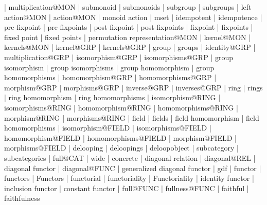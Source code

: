     |   multiplication@MON
    |   submonoid
    |   submonoids
    |   subgroup
    |   subgroups
    |   left action@MON
    |   action@MON
    |   monoid action
    |   mset
    |   idempotent
    |   idempotence 
    |   pre-fixpoint
    |   pre-fixpoints
    |   post-fixpoint
    |   post-fixpoints
    |   fixpoint
    |   fixpoints
    |   fixed point
    |   fixed points
    |   permutation representation@MON
    |   kernel@MON
    |   kernels@MON
    |   kernel@GRP
    |   kernels@GRP
    |   group
    |   groups
    |   identity@GRP
    |   multiplication@GRP
    |   isomorphism@GRP
    |   isomorphisms@GRP
    |   group isomorphism
    |   group isomorphisms
    |   group homomorphism
    |   group homomorphisms
    |   homomorphism@GRP
    |   homomorphisms@GRP
    |   morphism@GRP
    |   morphisms@GRP
    |   inverse@GRP
    |   inverses@GRP
    |   ring
    |   rings
    |   ring homomorphism
    |   ring homomorphisms
    |   isomorphism@RING
    |   isomorphisms@RING
    |   homomorphism@RING
    |   homomorphisms@RING
    |   morphism@RING
    |   morphisms@RING
    |   field
    |   fields
    |   field homomorphism
    |   field homomorphisms
    |   isomorphism@FIELD
    |   isomorphisms@FIELD
    |   homomorphism@FIELD
    |   homomorphisms@FIELD
    |   morphism@FIELD
    |   morphisms@FIELD
    |   delooping
    |   deloopings
    |   deloopobject
    |   subcategory
    |   subcategories
    |   full@CAT
    |   wide
    |   concrete
    |   diagonal relation
    |   diagonal@REL
    |   diagonal functor
    |   diagonal@FUNC
    |   generalized diagonal functor
    |   gdf
    |   functor
    |   functors
    |   Functors
    |   functorial
    |   functoriality
    |   Functoriality
    |   identity functor
    |   inclusion functor
    |   constant functor
    |   full@FUNC
    |   fullness@FUNC
    |   faithful
    |   faithfulness
